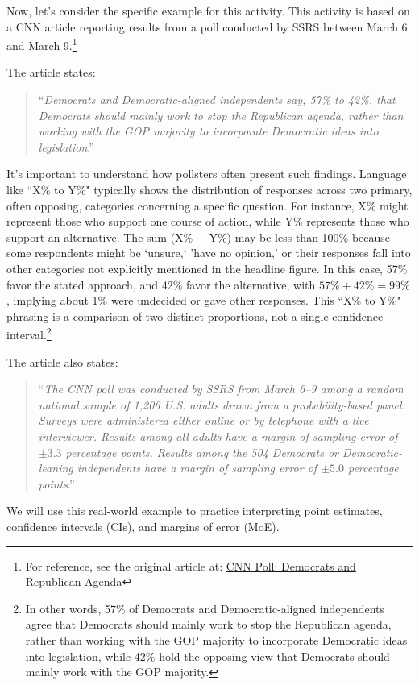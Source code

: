 \documentclass[12pt]{article}
\begin{document}
Now, let's consider the specific example for this activity. This activity is based on a CNN article reporting results from a poll conducted by SSRS between March 6 and March 9.\footnote{For reference, see the original article at: \href{https://www.cnn.com/2025/03/16/politics/cnn-poll-democrats/index.html}{CNN Poll: Democrats and Republican Agenda}}

The article states:
\begin{quote}
``\emph{Democrats and Democratic-aligned independents say, 57\% to 42\%, that Democrats should mainly work to stop the Republican agenda, rather than working with the GOP majority to incorporate Democratic ideas into legislation}.''
\end{quote}
It's important to understand how pollsters often present such findings. Language like ``X\% to Y\%" typically shows the distribution of responses across two primary, often opposing, categories concerning a specific question. For instance, X\% might represent those who support one course of action, while Y\% represents those who support an alternative. The sum (X\% + Y\%) may be less than 100\% because some respondents might be `unsure,` 'have no opinion,' or their responses fall into other categories not explicitly mentioned in the headline figure. In this case, 57\% favor the stated approach, and 42\% favor the alternative, with $57\% + 42\% = 99\%$, implying about 1\% were undecided or gave other responses. This ``X\% to Y\%" phrasing is a comparison of two distinct proportions, not a single confidence interval.\footnote{In other words, 57\% of Democrats and Democratic-aligned independents agree that Democrats should mainly work to stop the Republican agenda, rather than working with the GOP majority to incorporate Democratic ideas into legislation, while 42\% hold the opposing view that Democrats should mainly work with the GOP majority.}

The article also states:
\begin{quote}
``\emph{The CNN poll was conducted by SSRS from March 6--9 among a random national sample of 1,206 U.S. adults drawn from a probability-based panel. Surveys were administered either online or by telephone with a live interviewer. Results among all adults have a margin of sampling error of $\pm 3.3$ percentage points. Results among the 504 Democrats or Democratic-leaning independents have a margin of sampling error of $\pm 5.0$ percentage points}.''
\end{quote}

We will use this real-world example to practice interpreting point estimates, confidence intervals (CIs), and margins of error (MoE).
\end{document}
